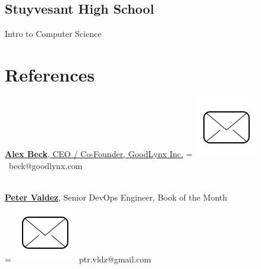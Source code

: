 \documentclass[]{plushcv}
\begin{document}
\begin{minipage}[t]{0.25\textwidth}
\sectionsep
\subsection{Stuyvesant High School}
Intro to Computer Science \\
\sectionsep


\section{References} 
\href{https://www.linkedin.com/in/alex-beck-07095793/}{\textbf{Alex Beck}, CEO / Co-Founder, GoodLynx Inc.}
\begingroup
{}=\hbox{
\includegraphics[scale=0.1,trim={0 1cm 0cm 0cm}]{icons/main/mail.png}\hspace{0.3cm} beck@goodlynx.com
}
\parbox{\wd0}{}
\endgroup
\\
\sectionsep
\href{https://www.linkedin.com/in/peter-valdez/}{\textbf{Peter Valdez}}, Senior DevOps Engineer, Book of the Month 
\\
\begingroup
{}=\hbox{
\includegraphics[scale=0.1,trim={0 1cm 0cm 0cm}]{icons/main/mail.png}\hspace{0.3cm} ptr.vldz@gmail.com
}
\parbox{\wd0}{}
\endgroup
\\


\end{minipage} 
\end{document}
